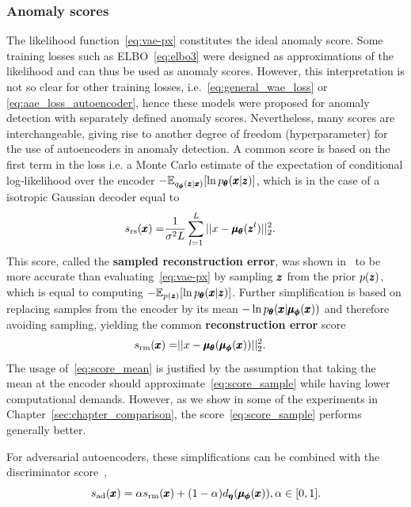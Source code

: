 \subsubsection{Anomaly scores}
The likelihood function~\eqref{eq:vae-px} constitutes the ideal anomaly score. Some training losses such as ELBO~\eqref{eq:elbo3} were designed as approximations of the likelihood and can thus be used as anomaly scores. However, this interpretation is not so clear for other training losses, i.e.~\eqref{eq:general_wae_loss} or \eqref{eq:aae_loss_autoencoder}, hence these models were proposed for anomaly detection with separately defined anomaly scores. Nevertheless, many scores are interchangeable, giving rise to another degree of freedom (hyperparameter) for the use of autoencoders in anomaly detection. A common score is based on the first term in the loss i.e. a Monte Carlo estimate of the expectation of conditional log-likelihood over the encoder $- \mathbb{E}_{q_{\vc{\phi}}(\vc{z}|\vc{x})} \left[ \ln p_{\vc{\theta}}(\vc{x}| \vc{z}) \right]$, which is in the case of a isotropic Gaussian decoder equal to
\begin{align} \label{eq:score_sample}
s_{\text{rs}}(\pmb{{x}}) = & \frac{1}{\sigma^2 L} \sum_{l=1}^L \vert \vert x - \pmb{{\mu}}_{\pmb{{\theta}}} (\pmb{{z}} ^l) \vert \vert_2^2.
\end{align}
This score, called the \textbf{sampled reconstruction error}, was shown in~\cite{xu2018unsupervised} to be more accurate than evaluating~\eqref{eq:vae-px} by sampling $\pmb{{z}}$ from the prior $p(\pmb{{z}})$, which is equal to computing $- \mathbb{E}_{p(\vc{z})} \left[ \ln p_{\vc{\theta}}(\vc{x}| \vc{z}) \right]$. Further simplification is based on replacing samples from the encoder by its mean $- \ln p_{\pmb{{\theta}}}(\pmb{{x}}| \pmb{{\mu}}_{\pmb{{\phi}}}(\pmb{{x}}))$ and therefore avoiding sampling, yielding the common \textbf{reconstruction error} score
\begin{align} \label{eq:score_mean}
s_{\text{rm}}(\pmb{{x}}) = & \vert \vert x - \pmb{{\mu}}_{\pmb{{\theta}}} ( \pmb{{\mu}}_{\pmb{{\phi}}}(\pmb{{x}}) )  \vert \vert_2^2.
\end{align}
The usage of~\eqref{eq:score_mean} is justified by the assumption that taking the mean at the encoder should approximate~\eqref{eq:score_sample} while having lower computational demands. However, as we show in some of the experiments in Chapter~\ref{sec:chapter_comparison}, the score~\eqref{eq:score_sample} performs generally better.

For adversarial autoencoders, these simplifications can be combined with the discriminator score~\cite{schlegl2017unsupervised, zenatiEfficientGANBasedAnomaly2018},
\begin{equation}
    s_{\text{ad}}(\vc{x}) = \alpha s_{\text{rm}}(\vc{x}) + (1-\alpha) d_{\vc{\eta}}(\vc{\mu}_{\vc{\phi}}(\vc{x})), \alpha \in \left[ 0, 1 \right].
\label{eq:aae_score}
\end{equation}

